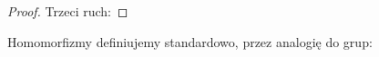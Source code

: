 \begin{proof}
\begin{comment}
            \strand[semithick] (-10, 4) to (-7, 4) [in=left, out=right] to (0, 1) [in=left, out=right] to (7, 4) to (10, 4) to (15, 4);
            \node[darkblue] at (-10, -4)[left] {$y$};
            \node[darkblue] at (-10, 4)[left] {$x$};
        \end{knot}
        \end{tikzpicture}
    \]
\end{comment}
    Trzeci ruch:
\begin{comment}
    \[
        \begin{tikzpicture}[baseline=-0.65ex,scale=0.07]
        \begin{knot}[clip width=5, flip crossing/.list={3}]
            \node[darkblue] at (-10, 10) [left] {$z$};
            \strand[semithick,-Latex] (-10, 10) [in=left, out=right] to (10,-10) to (15,-10);
            \node[darkblue] at (-10, 0) [left] {$y$};
            \strand[semithick,-Latex] (-10, 0) [in=left, out=right] to (0, 10) [in=left, out=right] to (10, 0) to (15, 0);
            \node[darkblue] at (-10, -10) [left] {$x$};
            \strand[semithick,-Latex] (-10, -10) [in=left, out=right] to (10,10) to (15,10);
            \node[darkblue] at (0, 10) [above] {$y \triangleright z$};
            \node[darkblue] at (15, 10) [right] {$(x \triangleright z) \triangleright (y \triangleright z)$};
        \end{knot}
        \end{tikzpicture}
        \stackrel{R_3}{\cong} \,\,
        \begin{tikzpicture}[baseline=-0.65ex,scale=0.07]
        \begin{knot}[clip width=5, flip crossing/.list={3}]
            \node[darkblue] at (-10, 10) [left] {$z$};
            \strand[semithick,-Latex] (-10, 10) [in=left, out=right] to (10,-10)  to (15, -10);
            \node[darkblue] at (-10, 0) [left] {$y$};
            \strand[semithick,-Latex] (-10, 0) [in=left, out=right] to (0, -10) [in=left, out=right] to (10, 0) to (15, 0);
            \node[darkblue] at (-10, -10) [left] {$x$};
            \strand[semithick,-Latex] (-10, -10) [in=left, out=right] to (10,10) to (15, 10);
            \node[darkblue] at (15, 10) [right] {$(x \triangleright y) \triangleright z$};
        \end{knot}
        \end{tikzpicture}
        \qedhere
    \]
\end{comment}
\end{proof}

Homomorfizmy definiujemy standardowo, przez analogię do grup:

